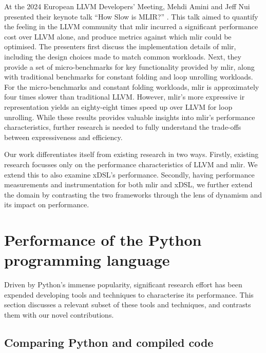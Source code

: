 At the 2024 European LLVM Developers' Meeting, Mehdi Amini and Jeff Nui presented their keynote talk ``How Slow is MLIR?'' \cite{aminiHowSlowMLIR2024}.
This talk aimed to quantify the feeling in the LLVM community that \ac{mlir} incurred a significant performance cost over LLVM alone, and produce metrics against which \ac{mlir} could be optimised.
The presenters first discuss the implementation details of \ac{mlir}, including the design choices made to match common workloads.
Next, they provide a set of micro-benchmarks for key functionality provided by \ac{mlir}, along with traditional benchmarks for constant folding and loop unrolling workloads. For the micro-benchmarks and constant folding workloads, \ac{mlir} is approximately four times slower than traditional LLVM. However, \ac{mlir}'s more expressive \ac{ir} representation yields an eighty-eight times speed up over LLVM for loop unrolling.
While these results provides valuable insights into \ac{mlir}'s performance characteristics, further research is needed to fully understand the trade-offs between expressiveness and efficiency.


Our work differentiates itself from existing research in two ways.
Firstly, existing research focusses only on the performance characteristics of LLVM and \ac{mlir}. We extend this to also examine xDSL's performance.
Secondly, having performance measurements and instrumentation for both \ac{mlir} and xDSL, we further extend the domain by contrasting the two frameworks through the lens of dynamism and its impact on performance.






\section{Performance of the Python programming language}
\label{sec:python-performance}

Driven by Python's immense popularity, significant research effort has been expended developing tools and techniques to characterise its performance.
This section discusses a relevant subset of these tools and techniques, and contrasts them with our novel contributions.


\subsection{Comparing Python and compiled code}
\label{sec:python-performance-comparing}

